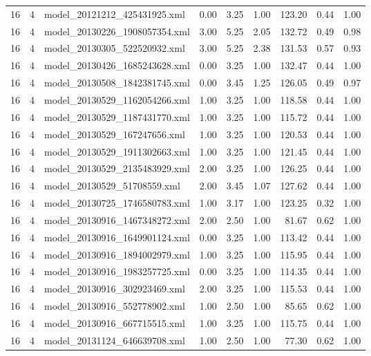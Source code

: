 \begin{table}[ht]
\begin{tabular}{rrlrrrrrr}
   16 &   4 & model\_20121212\_425431925.xml & 0.00 & 3.25 & 1.00 & 123.20 & 0.44 & 1.00 \\ 
   16 &   4 & model\_20130226\_1908057354.xml & 3.00 & 5.25 & 2.05 & 132.72 & 0.49 & 0.98 \\ 
   16 &   4 & model\_20130305\_522520932.xml & 3.00 & 5.25 & 2.38 & 131.53 & 0.57 & 0.93 \\ 
   16 &   4 & model\_20130426\_1685243628.xml & 0.00 & 3.25 & 1.00 & 132.47 & 0.44 & 1.00 \\ 
   16 &   4 & model\_20130508\_1842381745.xml & 0.00 & 3.45 & 1.25 & 126.05 & 0.49 & 0.97 \\ 
   16 &   4 & model\_20130529\_1162054266.xml & 1.00 & 3.25 & 1.00 & 118.58 & 0.44 & 1.00 \\ 
   16 &   4 & model\_20130529\_1187431770.xml & 1.00 & 3.25 & 1.00 & 115.72 & 0.44 & 1.00 \\ 
   16 &   4 & model\_20130529\_167247656.xml & 1.00 & 3.25 & 1.00 & 120.53 & 0.44 & 1.00 \\ 
   16 &   4 & model\_20130529\_1911302663.xml & 1.00 & 3.25 & 1.00 & 121.45 & 0.44 & 1.00 \\ 
   16 &   4 & model\_20130529\_2135483929.xml & 2.00 & 3.25 & 1.00 & 126.25 & 0.44 & 1.00 \\ 
   16 &   4 & model\_20130529\_51708559.xml & 2.00 & 3.45 & 1.07 & 127.62 & 0.44 & 1.00 \\ 
   16 &   4 & model\_20130725\_1746580783.xml & 1.00 & 3.17 & 1.00 & 123.25 & 0.32 & 1.00 \\ 
   16 &   4 & model\_20130916\_1467348272.xml & 2.00 & 2.50 & 1.00 & 81.67 & 0.62 & 1.00 \\ 
   16 &   4 & model\_20130916\_1649901124.xml & 0.00 & 3.25 & 1.00 & 113.42 & 0.44 & 1.00 \\ 
   16 &   4 & model\_20130916\_1894002979.xml & 1.00 & 3.25 & 1.00 & 115.95 & 0.44 & 1.00 \\ 
   16 &   4 & model\_20130916\_1983257725.xml & 0.00 & 3.25 & 1.00 & 114.35 & 0.44 & 1.00 \\ 
   16 &   4 & model\_20130916\_302923469.xml & 2.00 & 3.25 & 1.00 & 115.53 & 0.44 & 1.00 \\ 
   16 &   4 & model\_20130916\_552778902.xml & 1.00 & 2.50 & 1.00 & 85.65 & 0.62 & 1.00 \\ 
   16 &   4 & model\_20130916\_667715515.xml & 1.00 & 3.25 & 1.00 & 115.75 & 0.44 & 1.00 \\ 
   16 &   4 & model\_20131124\_646639708.xml & 1.00 & 2.50 & 1.00 & 77.30 & 0.62 & 1.00 \\ 

\end{tabular}
\end{table}
